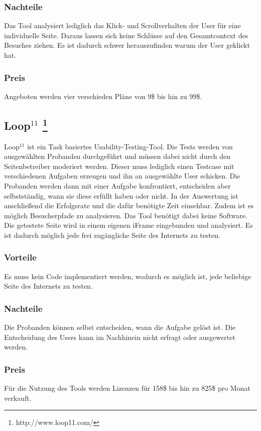 \subsubsection*{Nachteile}
Das Tool analysiert lediglich das Klick- und Scrollverhalten der User für eine individuelle Seite. Daraus lassen sich keine Schlüsse auf den Gesamtcontext des Besuches ziehen. Es ist dadurch schwer herauszufinden warum der User geklickt hat.

\subsubsection*{Preis}
Angeboten werden vier verschieden Pläne von 9\$ bis hin zu 99\$.

\subsection*{Loop$^{11}$ \footnote{http://www.loop11.com/}}

Loop$^{11}$ ist ein Task basiertes Usability-Testing-Tool. Die Tests werden von ausgewählten Probanden durchgeführt und müssen dabei nicht durch den Seitenbetreiber moderiert werden. Dieser muss lediglich einen Testcase mit verschiedenen Aufgaben erzeugen und ihn an ausgewählte User schicken. Die Probanden werden dann mit einer Aufgabe konfrontiert, entscheiden aber selbstständig, wann sie diese erfüllt haben oder nicht. In der Auswertung ist anschließend die Erfolgsrate und die dafür benötigte Zeit einsehbar. Zudem ist es möglich Besucherpfade zu analysieren. Das Tool benötigt dabei keine Software. Die getestete Seite wird in einem eigenen iFrame eingebunden und analysiert. Es ist dadurch möglich jede frei zugängliche Seite des Internets zu testen.

\subsubsection*{Vorteile}
Es muss kein Code implementiert werden, wodurch es möglich ist, jede beliebige Seite des Internets zu testen.

\subsubsection*{Nachteile}
Die Probanden können selbst entscheiden, wann die Aufgabe gelöst ist. Die Entscheidung des Users kann im Nachhinein nicht erfragt oder ausgewertet werden.

\subsubsection*{Preis}
Für die Nutzung des Tools werden Lizenzen für 158\$ bis hin zu 825\$ pro Monat verkauft.

